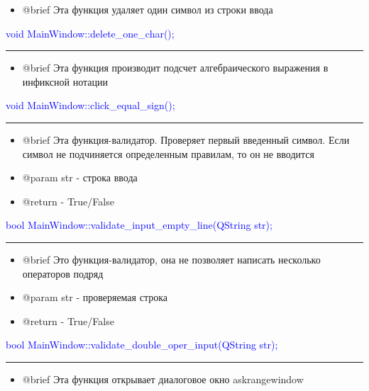 \documentclass{article}
\begin{document}
\begin{itemize}

\item @brief Эта функция удаляет один символ из строки ввода

\end{itemize}

\textcolor{blue}{void MainWindow::delete\_one\_char();}

{\color{red} \rule{\linewidth}{0.5mm}}


\begin{itemize}

\item @brief Эта функция производит подсчет алгебраического выражения в инфиксной нотации

\end{itemize}

\textcolor{blue}{void MainWindow::click\_equal\_sign();}

{\color{red} \rule{\linewidth}{0.5mm}}


\begin{itemize}

\item @brief Эта функция-валидатор. Проверяет первый введенный символ. Если символ не подчиняется определенным правилам, то он не вводится
\item @param str - строка ввода
\item @return - True/False

\end{itemize}

\textcolor{blue}{bool MainWindow::validate\_input\_empty\_line(QString str);}

{\color{red} \rule{\linewidth}{0.5mm}}


\begin{itemize}

\item @brief Это функция-валидатор, она не позволяет написать несколько операторов подряд
\item @param str - проверяемая строка
\item @return - True/False

\end{itemize}

\textcolor{blue}{bool MainWindow::validate\_double\_oper\_input(QString str);}

{\color{red} \rule{\linewidth}{0.5mm}}


\begin{itemize}

\item @brief Эта функция открывает диалоговое окно askrangewindow

\end{itemize}
\end{document}
